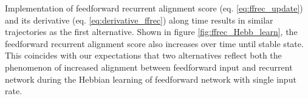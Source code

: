 \documentclass[11pt]{article}
\begin{document}
	Implementation of feedforward recurrent alignment score (eq. \ref{eq:ffrec_update}) and its derivative (eq. \ref{eq:derivative_ffrec}) along time results in similar trajectories as the first alternative. Shown in figure \ref{fig:ffrec_Hebb_learn}, the feedforward recurrent alignment score also increases over time until stable state. This coincides with our expectations that two alternatives reflect both the phenomenon of increased alignment between feedforward input and recurrent network during the Hebbian learning of feedforward network with single input rate. 

	
\end{document}
